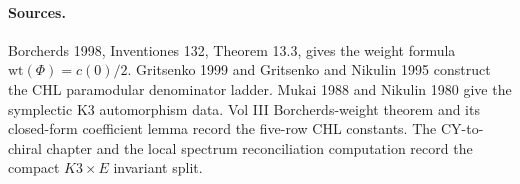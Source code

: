\paragraph{Sources.}
Borcherds 1998, Inventiones 132, Theorem 13.3, gives the weight formula
$\mathrm{wt}(\Phi)=c(0)/2$. Gritsenko 1999 and Gritsenko and Nikulin
1995 construct the CHL paramodular denominator ladder. Mukai 1988 and
Nikulin 1980 give the symplectic K3 automorphism data. Vol III
Borcherds-weight theorem and its closed-form coefficient lemma record
the five-row CHL constants. The CY-to-chiral chapter and the local
spectrum reconciliation computation record the compact $K3\times E$
invariant split.
